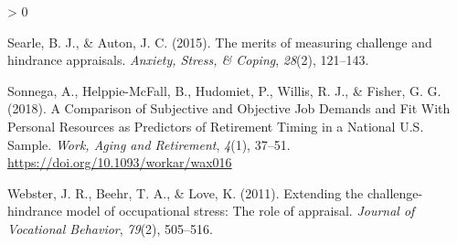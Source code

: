 \documentclass[
  english,
  man]{apa6}
\newlength{\cslhangindent}
\newenvironment{CSLReferences}[2] %
 {%
  \setlength{\parindent}{0pt}
  \ifodd #1 \everypar{\setlength{\hangindent}{\cslhangindent}}\ignorespaces\fi
  \ifnum #2 > 0
  \setlength{\parskip}{#2\baselineskip}
  \fi
 }%
 {}
\begin{document}
\begin{CSLReferences}{1}{0}
\leavevmode\hypertarget{ref-searle2015merits}{}%
Searle, B. J., \& Auton, J. C. (2015). The merits of measuring challenge and hindrance appraisals. \emph{Anxiety, Stress, \& Coping}, \emph{28}(2), 121--143.

\leavevmode\hypertarget{ref-sonnega_comparison_2018}{}%
Sonnega, A., Helppie-McFall, B., Hudomiet, P., Willis, R. J., \& Fisher, G. G. (2018). A {Comparison} of {Subjective} and {Objective} {Job} {Demands} and {Fit} {With} {Personal} {Resources} as {Predictors} of {Retirement} {Timing} in a {National} {U}.{S}. {Sample}. \emph{Work, Aging and Retirement}, \emph{4}(1), 37--51. \url{https://doi.org/10.1093/workar/wax016}

\leavevmode\hypertarget{ref-webster2011extending}{}%
Webster, J. R., Beehr, T. A., \& Love, K. (2011). Extending the challenge-hindrance model of occupational stress: The role of appraisal. \emph{Journal of Vocational Behavior}, \emph{79}(2), 505--516.

\end{CSLReferences}

\endgroup
\end{document}
